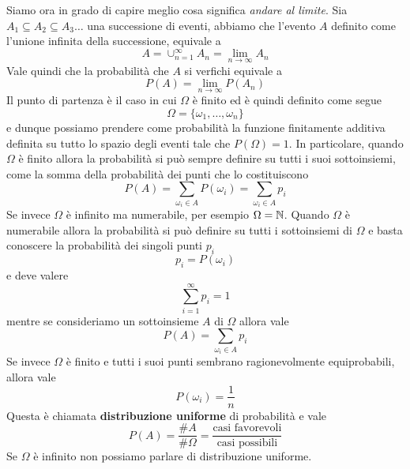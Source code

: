 Siamo ora in grado di capire meglio cosa significa \emph{andare al limite}. Sia
$A_1 \subseteq A_2 \subseteq A_3 \dots$ una successione di eventi, abbiamo che l'evento $A$ definito come
l'unione infinita della successione, equivale a
\[ A = \cup_{n=1}^\infty A_n = \lim_{n \to \infty} A_n \]
Vale quindi che la probabilità che $A$ si verfichi equivale a
\[ P(A) = \lim_{n \to \infty} P(A_n) \]
Il punto di partenza è il caso in cui $\Omega$ è finito ed è quindi definito come segue
\[ \Omega = \{ \omega_1, \dots, \omega_n \} \]
e dunque possiamo prendere come probabilità la funzione finitamente additiva definita su tutto lo spazio
degli eventi tale che $P(\Omega) = 1$. In particolare, quando $\Omega$ è finito allora la probabilità si
può sempre definire su tutti i suoi sottoinsiemi, come la somma della probabilità dei punti che lo
costituiscono
\[ P(A) = \sum_{\omega_i \in A} P(\omega_i) = \sum_{\omega_i \in A} p_i \]
Se invece $\Omega$ è infinito ma numerabile, per esempio $\Omega = \mathbb{N}$. Quando $\Omega$ è numerabile allora
la probabilità si può definire su tutti i sottoinsiemi di $\Omega$ e basta conoscere la probabilità dei
singoli punti $p_i$
\[ p_i = P(\omega_i) \]
e deve valere
\[ \sum_{i=1}^\infty p_i = 1 \]
mentre se consideriamo un sottoinsieme $A$ di $\Omega$ allora vale
\[ P(A) = \sum_{\omega_i \in A} p_i \]
Se invece $\Omega$ è finito e tutti i suoi punti sembrano ragionevolmente equiprobabili, allora vale
\[ P(\omega_i) = \frac{1}{n} \]
Questa è chiamata \textbf{distribuzione uniforme} di probabilità e vale
\[ P(A) = \frac{\# A}{\# \Omega} = \frac{\text{casi favorevoli}}{\text{casi possibili}} \]
Se $\Omega$ è infinito non possiamo parlare di distribuzione uniforme.

